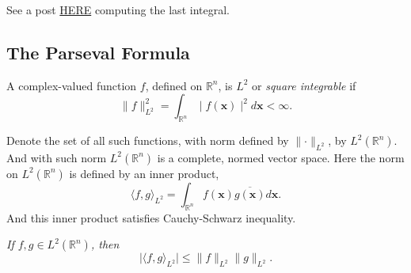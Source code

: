\begin{Example}
    See a post \href{https://math.stackexchange.com/questions/390810/improper-integral-sinx-x-converges-absolutely-conditionally-or-diverges}{HERE} computing the last integral.
\end{Example}

\begin{Example}[Example 4.2.3.]
    
\end{Example}

\subsection{The Parseval Formula}
\begin{Definition}[Definition 4.2.4.]
A complex-valued function $f$, defined on $\mathbb R^n$, is $L^2$ or \textit{square integrable} if 
\[\lVert f\rVert^2 _{L^2} = \int_{\mathbb R^n} \mid f(\mathbf x)\mid ^2d\mathbf{x} <\infty.\]
\end{Definition}
Denote the set of all such functions, with norm defined by $\lVert \cdot\rVert_{L^2}$, by $L^2(\mathbb R^n)$. And with such norm $L^2(\mathbb R^n)$ is a complete, normed vector space. 
Here the norm on $L^2(\mathbb R^n)$ is defined by an inner product,
\[\langle f,g\rangle_{L^2} = \int_{\mathbb R^n} f(\mathbf x)\overline{g(\mathbf x)}d\mathbf x.\]
And this inner product satisfies Cauchy-Schwarz inequality.
\begin{Proposition}[Proposition 4.2.4.]\label{Proposition 4.2.4.}
\textit{If $f,g\in L^2(\mathbb R^n)$, then \[\mid\langle f,g\rangle_{L^2}\mid \leq \lVert f\rVert_{L^2}\lVert g\rVert_{L^2}.\]}
\end{Proposition}

